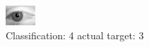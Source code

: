 \begin{figure}[h!]
\begin{center}
\includegraphics[width=0.60\columnwidth]{figures/ID2813_class_4_target_3.png}
\end{center}
\caption{ Classification: 4 actual target: 3}
\label{fig:ID2813_class_4_target_3}
\end{figure}
